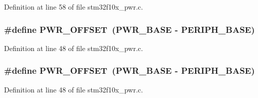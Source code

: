 Definition at line 58 of file stm32f10x\+\_\+pwr.\+c.

\subsubsection[{\texorpdfstring{P\+W\+R\+\_\+\+O\+F\+F\+S\+ET}{PWR_OFFSET}}]{\setlength{\rightskip}{0pt plus 5cm}\#define P\+W\+R\+\_\+\+O\+F\+F\+S\+ET~({\bf P\+W\+R\+\_\+\+B\+A\+SE} -\/ {\bf P\+E\+R\+I\+P\+H\+\_\+\+B\+A\+SE})}\hypertarget{group___p_w_r___private___defines_ga7f88bce73931300319824f22578f90de}{}\label{group___p_w_r___private___defines_ga7f88bce73931300319824f22578f90de}


Definition at line 48 of file stm32f10x\+\_\+pwr.\+c.

\subsubsection[{\texorpdfstring{P\+W\+R\+\_\+\+O\+F\+F\+S\+ET}{PWR_OFFSET}}]{\setlength{\rightskip}{0pt plus 5cm}\#define P\+W\+R\+\_\+\+O\+F\+F\+S\+ET~({\bf P\+W\+R\+\_\+\+B\+A\+SE} -\/ {\bf P\+E\+R\+I\+P\+H\+\_\+\+B\+A\+SE})}\hypertarget{group___p_w_r___private___defines_ga7f88bce73931300319824f22578f90de}{}\label{group___p_w_r___private___defines_ga7f88bce73931300319824f22578f90de}


Definition at line 48 of file stm32f10x\+\_\+pwr.\+c.

